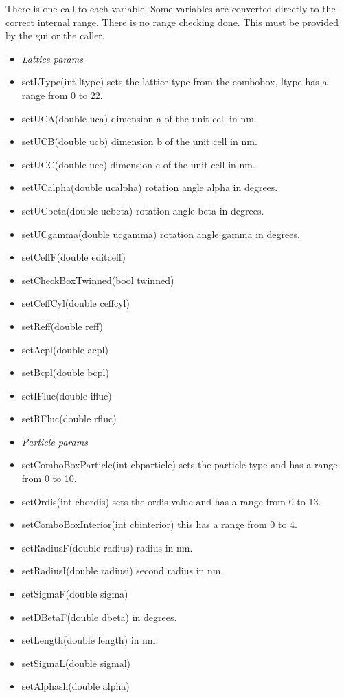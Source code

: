 \documentclass[11pt]{article} %
\begin{document}
There is one call to each variable. Some variables are converted directly to the correct internal range. There is no range checking done. This must be provided by the gui or the caller.
\begin{itemize}\itemsep0pt
%
\item[] {\it Lattice params}
\item setLType(int ltype) sets the lattice type from the combobox, ltype has a range from 0 to 22.
\item setUCA(double uca) dimension a of the unit cell in nm.
\item setUCB(double ucb) dimension b of the unit cell in nm.
\item setUCC(double ucc) dimension c of the unit cell in nm.
\item setUCalpha(double ucalpha) rotation angle alpha in degrees.
\item setUCbeta(double ucbeta) rotation angle beta in degrees.
\item setUCgamma(double ucgamma) rotation angle gamma in degrees.
\item setCeffF(double editceff)
\item setCheckBoxTwinned(bool twinned)
\item setCeffCyl(double ceffcyl)
\item setReff(double reff)
\item setAcpl(double acpl)
\item setBcpl(double bcpl)
\item setIFluc(double ifluc)
\item setRFluc(double rfluc)
% 
\item[] {\it Particle params}
\item setComboBoxParticle(int cbparticle) sets the particle type and has a range from 0 to 10.
\item setOrdis(int cbordis) sets the ordis value and has a range from 0 to 13.
\item setComboBoxInterior(int cbinterior) this has a range from 0 to 4.
\item setRadiusF(double radius) radius in nm.
\item setRadiusI(double radiusi) second radius in nm.
\item setSigmaF(double sigma)
\item setDBetaF(double dbeta) in degrees.
\item setLength(double length) in nm.
\item setSigmaL(double sigmal)
\item setAlphash(double alpha)

\end{itemize}
\end{document}
